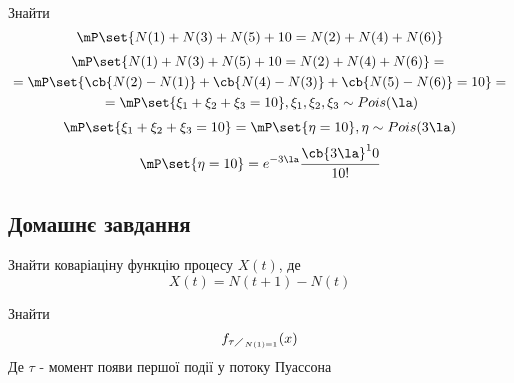 \begin{tsk}
	Знайти
	\begin{equation}
		\mP\set{N(1)+N(3)+N(5) +10 = N(2)+N(4)+N(6)}
	\end{equation}
	\begin{multline}
		\mP\set{N(1)+N(3)+N(5) +10 = N(2)+N(4)+N(6)} = {} \\ {} = \mP\set{\cb{N(2)-N(1)} + \cb{N(4) - N(3)} + \cb{N(5)-N(6)} = 10} ={}\\{} = \mP\set{\xi_1+\xi_2+\xi_3 = 10},\xi_1,\xi_2,\xi_3\sim Pois(\la)
	\end{multline}
	\begin{equation}
		\mP\set{\xi_1+\xi_2+\xi_3 = 10} = \mP\set{\eta = 10},\eta\sim Pois(3\la)
	\end{equation}
	\begin{equation}
		\mP\set{\eta=10} = e^{-3\la} \cfrac{\cb{3\la}^10}{10!}
	\end{equation}
\end{tsk}
\subsection{Домашнє завдання}
\begin{tsk}
	Знайти коваріаціну функцію процесу $X(t)$, де
	\begin{equation}
		X(t) = N(t+1)-N(t)
	\end{equation}
\end{tsk}
\begin{tsk}
	Знайти
	\begin{equation}
		f_{\tau\diagup_{N(1)=1}} (x)
	\end{equation}
	Де $\tau$ - момент появи першої події у потоку Пуассона
\end{tsk}

